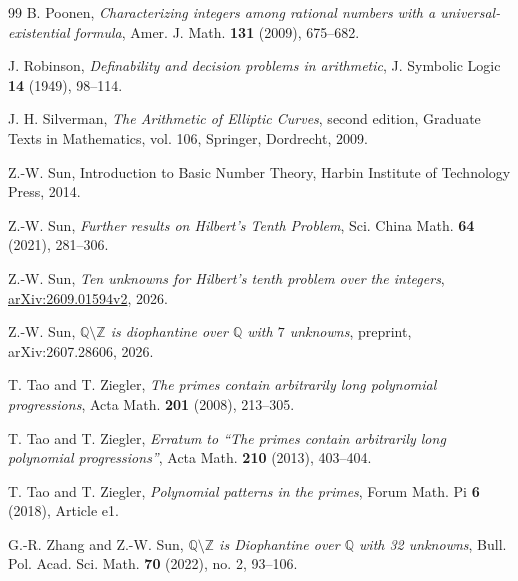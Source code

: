 \documentclass[11pt,reqno]{amsart}
\theoremstyle{definition}
\numberwithin{equation}{section}
\newcommand{\Q}{\mathbb Q}
\newcommand{\Z}{\mathbb Z}
\def\sm{\setminus}
\begin{document}
\begin{thebibliography}{99}
 B. Poonen,
\emph{Characterizing integers among rational numbers with a universal-existential formula},
Amer. J. Math. \textbf{131} (2009), 675--682.

 J. Robinson,
\emph{Definability and decision problems in arithmetic},
J. Symbolic Logic \textbf{14} (1949), 98--114.

 J. H. Silverman,
\emph{The Arithmetic of Elliptic Curves}, second edition,
Graduate Texts in Mathematics, vol. 106, Springer, Dordrecht, 2009.

 Z.-W. Sun, Introduction to Basic Number Theory, Harbin Institute of Technology Press, 2014.

 Z.-W. Sun,
\emph{Further results on Hilbert's Tenth Problem},
Sci. China Math. \textbf{64} (2021), 281--306.


 Z.-W. Sun,
\emph{Ten unknowns for Hilbert's tenth problem over the integers}, \href{https://arxiv.org/abs/2609.01594v2}{arXiv:2609.01594v2}, 2026.

 Z.-W. Sun, {\it $\Q\sm\Z$ is diophantine over $\Q$ with $7$ unknowns}, preprint, arXiv:2607.28606, 2026.

 T. Tao and T. Ziegler,
\emph{The primes contain arbitrarily long polynomial progressions},
Acta Math. \textbf{201} (2008), 213--305.

 T. Tao and T. Ziegler,
\emph{Erratum to ``The primes contain arbitrarily long polynomial progressions''},
Acta Math. \textbf{210} (2013), 403--404.

 T. Tao and T. Ziegler, \emph{Polynomial patterns in the primes}, Forum Math. Pi \textbf{6} (2018), Article e1. 

 G.-R. Zhang and Z.-W. Sun,
\emph{$\Q\setminus\Z$ is Diophantine over $\Q$ with 32 unknowns},
Bull. Pol. Acad. Sci. Math. \textbf{70} (2022), no. 2, 93--106.

\end{thebibliography}
\end{document}
